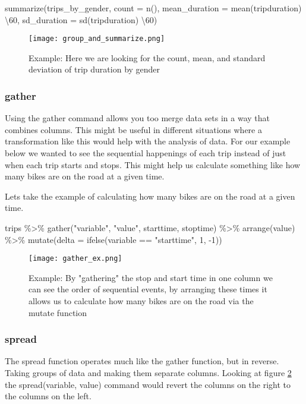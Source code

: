 \begin{center}
summarize(trips\_by\_gender, count = n(), mean\_duration = mean(tripduration) \textbackslash 60, sd\_duration = sd(tripduration) \textbackslash 60)
\end{center}    

\begin{figure}[H]
    \centering
    \texttt{[image: group\_and\_summarize.png]}
    \caption{Example: Here we are looking for the count, mean, and standard deviation of trip duration by gender }
    \label{fig:group_and_summarize}
\end{figure}


\subsubsection{gather}
\begin{flushleft}
Using the gather command allows you too merge data sets in a way that combines columns. This might be useful in different situations where a transformation like this would help with the analysis of data. For our example below we wanted to see the sequential happenings of each trip instead of just when each trip starts and stops. This might help us calculate something like how many bikes are on the road at a given time. 
\end{flushleft}

\begin{flushleft}
Lets take the example of calculating how many bikes are on the road at a given time.
\end{flushleft}

\begin{center}
trips \%\textgreater\% gather("variable", "value", starttime, stoptime) \%\textgreater\% arrange(value) \%\textgreater\% mutate(delta = ifelse(variable == "starttime", 1, -1))
\end{center}    

\begin{figure}[H]
    \centering
    \texttt{[image: gather\_ex.png]}
    \caption{Example: By "gathering" the stop and start time in one column we can see the order of sequential events, by arranging these times it allows us to calculate how many bikes are on the road via the mutate function}
    \label{fig:gather_ex}
\end{figure}


\subsubsection{spread}
\begin{flushleft}
The spread function operates much like the gather function, but in reverse. Taking groups of data and making them separate columns. Looking at figure \ref{fig:gather_ex} the spread(variable, value) command would revert the columns on the right to the columns on the left.
\end{flushleft}


